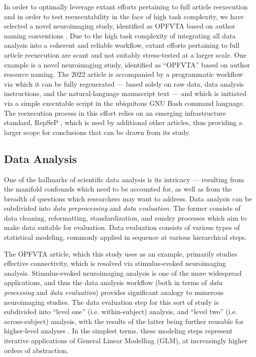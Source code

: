 In order to optimally leverage extant efforts pertaining to full article reexecution and in order to test reexecutability in the face of high task complexity, we have selected a novel neuroimaging study, identified as OPFVTA based on author naming conventions \cite{opfvta}.
Due to the high task complexity of integrating all data analysis into a coherent and reliable workflow, extant efforts pertaining to full article reexecution are scant and not suitably stress-tested at a larger scale.
One example is a novel neuroimaging study, identified as “OPFVTA” \cite{opfvta} based on author resource naming.
The 2022 article is accompanied by a programmatic workflow via which it can be fully regenerated — based solely on raw data, data analysis instructions, and the natural-language manuscript text — and which is initiated via a simple executable script in the ubiquitous GNU Bash \cite{bash} command language.
The reexecution process in this effort relies on an emerging infrastructure standard, RepSeP \cite{repsep}, which is used by additional other articles, thus providing a larger scope for conclusions that can be drawn from its study.


\subsection{Data Analysis}

One of the hallmarks of scientific data analysis is its intricacy — resulting from the manifold confounds which need to be accounted for, as well as from the breadth of questions which researchers may want to address.
Data analysis can be subdivided into \emph{data preprocessing} and \emph{data evaluation}.
The former consists of data cleaning, reformatting, standardization, and sundry processes which aim to make data suitable for evaluation.
Data evaluation consists of various types of statistical modeling, commonly applied in sequence at various hierarchical steps.

The OPFVTA article, which this study uses as an example, primarily studies effective connectivity, which is resolved via stimulus-evoked neuroimaging analysis.
Stimulus-evoked neuroimaging analysis is one of the more widespread applications, and thus the data analysis workflow (both in terms of \emph{data processing} and \emph{data evaluation}) provides significant analogy to numerous neuroimaging studies.
The data evaluation step for this sort of study is subdivided into “level one” (i.e. within-subject) analysis, and “level two” (i.e. across-subject) analysis, with the results of the latter being further reusable for higher-level analyses \cite{Friston1995}.
In the simplest terms, these modeling steps represent iterative applications of General Linear Modelling (GLM), at increasingly higher orders of abstraction.

